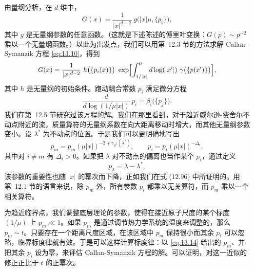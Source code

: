 由量纲分析，在 $d$ 维中，
\begin{equation}
  G(x) = \frac{1}{|x|^{d-2}}\ g\bigl( |x|\mu, \{p_i\} \bigr) ,
  \label{eq:13.11}
\end{equation}
其中 $g$ 是无量纲参数的任意函数。（这就是下述陈述的傅里叶变换：$G(p) \sim p^{-2}$ 乘以一个无量纲函数。）以此为出发点，我们可以用第~12.3 节的方法求解 Callan-Symanzik 方程 \eqref{eq:13.10}，得到
\begin{equation}
  G(x) = \frac{1}{|x|^{d-2}}\ h\bigl( \{p_i(x)\} \bigr)\ \exp\Bigl[
    \int_{1/|x|}^{\mu} d\log(|x'|)\ \gamma\bigl( \{p(x')\} \bigr) \Bigr] ,
  \label{eq:13.12}
\end{equation}
其中 $h$ 是无量纲的初始条件。跑动耦合常数 $p_i$ 满足微分方程
\begin{equation}
  \frac{d}{d\log(1/\mu|x|)}\ p_i = \beta_i\bigl( \{p_j\} \bigr) .
  \label{eq:13.13}
\end{equation}
我们在第~12.5 节研究过该方程的解。我们在那里看到，对于趋近威尔逊-费舍尔不动点附近的流，质量算符的无量纲系数在向大距离移动时增大，而其他无量纲参数变小。设 $\lambda^{*}$ 为不动点的位置。于是我们可以更明确地写出
\begin{equation}
  p_m = p_m(\mu|x|)^{-2+\gamma_{\phi^2}(\lambda^{*})},
  \qquad p_i = p_i(\mu|x|)^{-\Delta_i} ,
  \label{eq:13.14}
\end{equation}
其中对 $i \neq m$ 有 $\Delta_i > 0$。如果把 $\lambda$ 对不动点的偏离也当作某个 $p_i$，通过定义
\begin{equation}
  p_\lambda = \lambda - \lambda^{*} ,
  \label{eq:13.15}
\end{equation}
该参数的重要性也随 $|x|$ 的幂次而下降，正如我们在式 (12.96) 中所证明的。用第~12.1 节的语言来说，除 $p_m$ 外，所有参数 $p_i$ 都乘以无关算符，而 $p_m$ 乘以一个相关算符。

为趋近临界点，我们调整底层理论的参数，使得在接近原子尺度的某个标度 $(1/\mu)$ 上 $p_m \ll 1$。如果 $p_m$ 是通过调节热力学系统的温度来调整的，那么 $p_m \sim t$。只要存在一个距离尺度区域，在该区域中 $p_m$ 保持很小而其余 $p_i$ 可以忽略，临界标度律就有效。于是可以这样计算标度律：以 \eqref{eq:13.14} 给出的 $p_m$、并把其余 $p_i$ 设为零，来评估 Callan-Symanzik 方程的解。可以证明，对这一近似的修正正比于 $t$ 的正幂次。

